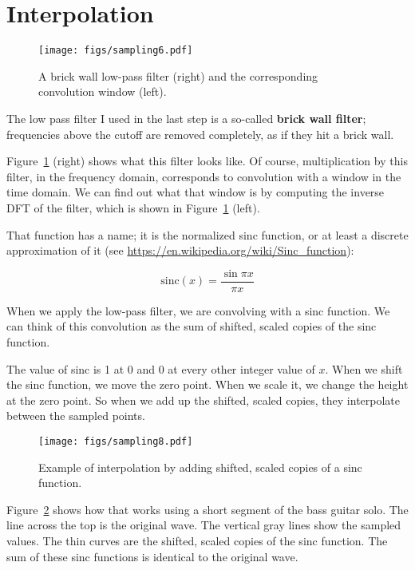 \section{Interpolation}

\begin{figure}
	\centerline{\texttt{[image: figs/sampling6.pdf]}}
	\caption{A brick wall low-pass filter (right) and the corresponding
		convolution window (left).}
	\label{fig.sampling6}
\end{figure}

The low pass filter I used in the last step is a so-called {\bf brick
	wall filter}; frequencies above the cutoff are removed completely,
as if they hit a brick wall.

Figure~\ref{fig.sampling6} (right) shows what this filter looks like.
Of course, multiplication by this filter, in the frequency domain,
corresponds to convolution with a window in the time domain.  We can
find out what that window is by computing the inverse DFT of the
filter, which is shown in Figure~\ref{fig.sampling6} (left).

That function has a name; it is the normalized sinc function, or at
least a discrete approximation of it (see
\url{https://en.wikipedia.org/wiki/Sinc_function}):

\[ \mathrm{sinc}(x) = \frac{\sin \pi x}{\pi x} \]

When we apply the low-pass filter, we are convolving with a sinc
function.  We can think of this convolution as the sum of shifted,
scaled copies of the sinc function.

The value of sinc is 1 at 0 and 0 at every other integer
value of $x$.  When we shift the sinc function, we move the zero point.
When we scale it, we change the height at the zero point.
So when we add up the shifted, scaled copies, they interpolate
between the sampled points.

\begin{figure}
	\centerline{\texttt{[image: figs/sampling8.pdf]}}
	\caption{Example of interpolation by adding shifted, scaled copies of a sinc function.}
	\label{fig.sampling8}
\end{figure}

Figure~\ref{fig.sampling8} shows how that works using a short segment
of the bass guitar solo.  The line across the top is the original
wave.  The vertical gray lines show the sampled values.  The thin
curves are the shifted, scaled copies of the sinc function.
The sum of these sinc functions is identical to the original wave.

